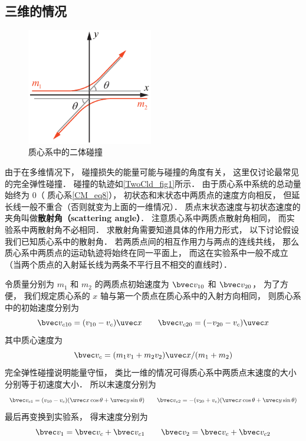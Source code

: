 \subsection{三维的情况}

\begin{figure}[ht]
\centering
\includegraphics[width=5.5cm]{./figures/TwoCld_1.pdf}
\caption{质心系中的二体碰撞} \label{TwoCld_fig1}
\end{figure}

由于在多维情况下， 碰撞损失的能量可能与碰撞的角度有关， 这里仅讨论最常见的完全弹性碰撞．
碰撞的轨迹如\autoref{TwoCld_fig1}所示． 由于质心系中系统的总动量始终为 0（ 质心系\autoref{CM_eq8}），  初状态和末状态中两质点的速度方向相反， 但延长线一般不重合（否则就变为上面的一维情况）． 质点末状态速度与初状态速度的夹角叫做\textbf{散射角（scattering angle）}． 注意质心系中两质点散射角相同， 而实验系中两散射角不必相同． 求散射角需要知道具体的作用力形式， 以下讨论假设我们已知质心系中的散射角．%
若两质点间的相互作用力与两点的连线共线， 那么质心系中两质点的运动轨迹将始终在同一平面上， 而这在实验系中一般不成立（当两个质点的入射延长线为两条不平行且不相交的直线时）．

令质量分别为 $m_1$ 和 $m_2$ 的两质点初始速度为 $\bvec v_{10}$ 和 $\bvec v_{20}$， 为了方便， 我们规定质心系的 $x$ 轴与第一个质点在质心系中的入射方向相同， 则质心系中的初始速度分别为
\begin{equation}
\bvec v_{c10} = (v_{10} - v_c)\uvec x \qquad \bvec v_{c20} = (-v_{20} - v_c) \uvec x
\end{equation}
其中质心速度为
\begin{equation}
\bvec v_c = (m_1 v_1 + m_2 v_2)\uvec x/(m_1 + m_2)
\end{equation}
完全弹性碰撞说明能量守恒， 类比一维的情况可得质心系中两质点末速度的大小分别等于初速度大小． 所以末速度分别为
\begin{equation}
\bvec v_{c1} = (v_{10} - v_c)(\uvec x\cos\theta + \uvec y\sin\theta) \qquad
\bvec v_{c2} = -(v_{20} + v_c)(\uvec x\cos\theta + \uvec y\sin\theta)
\end{equation}
最后再变换到实验系， 得末速度分别为
\begin{equation}
\bvec v_1 = \bvec v_c + \bvec v_{c1} \qquad
\bvec v_2 = \bvec v_c + \bvec v_{c2}
\end{equation}





